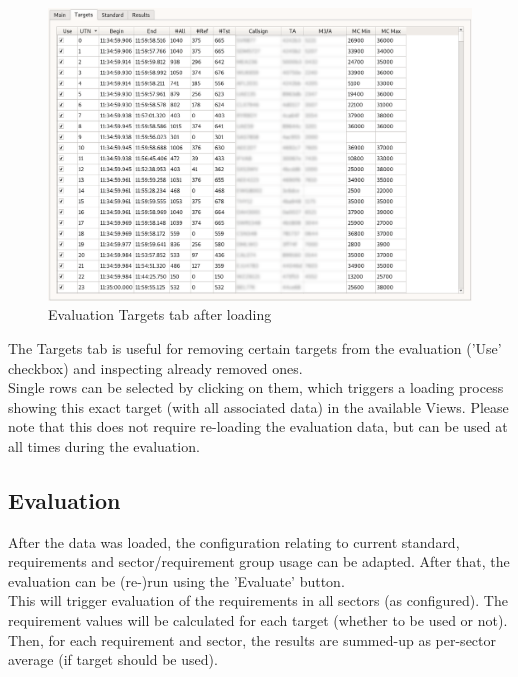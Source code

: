\begin{figure}[H]
  \hspace*{-2cm}
    \includegraphics[width=18cm,frame]{../screenshots/eval_targets.png}
  \caption{Evaluation Targets tab after loading}
\end{figure}

The Targets tab is useful for removing certain targets from the evaluation ('Use' checkbox) and inspecting already removed ones. \\

Single rows can be selected by clicking on them, which triggers a loading process showing this exact target (with all associated data) in the available Views. Please note that this does not require re-loading the evaluation data, but can be used at all times during the evaluation. \\

\subsection{Evaluation}
\label{sec:eval_run_eval} 

After the data was loaded, the configuration relating to current standard, requirements and sector/requirement group usage can be adapted. After that, the evaluation can be (re-)run using the 'Evaluate' button. \\

This will trigger evaluation of the requirements in all sectors (as configured). The requirement values will be calculated for each target (whether to be used or not). Then, for each requirement and sector, the results are summed-up as per-sector average (if target should be used). \\

